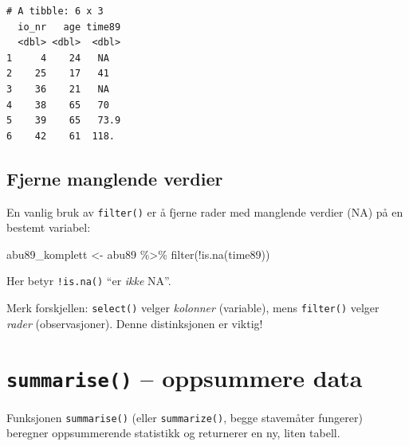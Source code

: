 \documentclass[
  norsk,
  letterpaper,
  DIV=11,
  numbers=noendperiod]{scrreprt}
\newenvironment{Shaded}{\begin{snugshade}}{\end{snugshade}}
\newcommand{\FunctionTok}[1]{\textcolor[rgb]{0.28,0.35,0.67}{#1}}
\newcommand{\NormalTok}[1]{\textcolor[rgb]{0.00,0.23,0.31}{#1}}
\newcommand{\OtherTok}[1]{\textcolor[rgb]{0.00,0.23,0.31}{#1}}
\newcommand{\SpecialCharTok}[1]{\textcolor[rgb]{0.37,0.37,0.37}{#1}}
\theoremstyle{definition}
\theoremstyle{remark}
\begin{document}
\begin{verbatim}
# A tibble: 6 x 3
  io_nr   age time89
  <dbl> <dbl>  <dbl>
1     4    24   NA  
2    25    17   41  
3    36    21   NA  
4    38    65   70  
5    39    65   73.9
6    42    61  118. 
\end{verbatim}

\subsection{Fjerne manglende verdier}\label{fjerne-manglende-verdier}

En vanlig bruk av \texttt{filter()} er å fjerne rader med manglende
verdier (NA) på en bestemt variabel:

\begin{Shaded}
\begin{Highlighting}[]
\NormalTok{abu89\_komplett }\OtherTok{\textless{}{-}}\NormalTok{ abu89 }\SpecialCharTok{\%\textgreater{}\%}
  \FunctionTok{filter}\NormalTok{(}\SpecialCharTok{!}\FunctionTok{is.na}\NormalTok{(time89))}
\end{Highlighting}
\end{Shaded}

Her betyr \texttt{!is.na()} ``er \emph{ikke} NA''.

\begin{tcolorbox}[enhanced jigsaw, breakable, colbacktitle=quarto-callout-note-color!10!white, arc=.35mm, leftrule=.75mm, bottomrule=.15mm, colback=white, coltitle=black, opacityback=0, toptitle=1mm, title=\textcolor{quarto-callout-note-color}{\faInfo}\hspace{0.5em}{Note}, colframe=quarto-callout-note-color-frame, toprule=.15mm, opacitybacktitle=0.6, titlerule=0mm, bottomtitle=1mm, rightrule=.15mm, left=2mm]

Merk forskjellen: \texttt{select()} velger \emph{kolonner} (variable),
mens \texttt{filter()} velger \emph{rader} (observasjoner). Denne
distinksjonen er viktig!

\end{tcolorbox}

\section{\texorpdfstring{\texttt{summarise()} -- oppsummere
data}{summarise() -- oppsummere data}}\label{summarise-oppsummere-data}

Funksjonen \texttt{summarise()} (eller \texttt{summarize()}, begge
stavemåter fungerer) beregner oppsummerende statistikk og returnerer en
ny, liten tabell.
\end{document}
